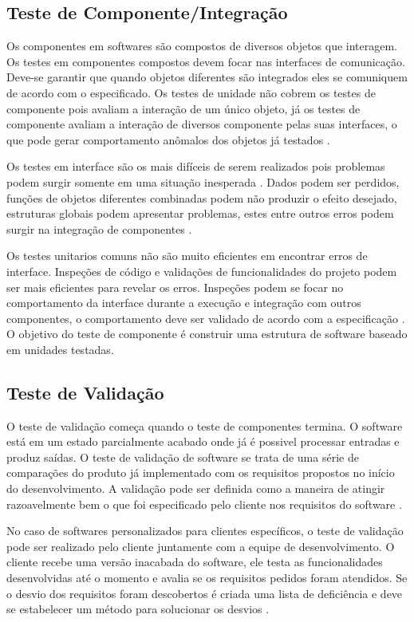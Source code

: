 \subsection{Teste de Componente/Integração}

Os componentes em softwares são compostos de diversos objetos que interagem. Os testes em componentes compostos devem focar nas interfaces de comunicação. Deve-se garantir que quando objetos diferentes são integrados eles se comuniquem de acordo com o especificado. Os testes de unidade não cobrem os testes de componente pois avaliam a interação de um único objeto, já os testes de componente avaliam a interação de diversos componente pelas suas interfaces, o que pode gerar comportamento anômalos dos objetos já testados \cite{SOMMER2011}.


Os testes em interface são os mais difíceis de serem realizados pois problemas podem surgir somente em uma situação inesperada \cite{SOMMER2011}. Dados podem ser perdidos, funções de objetos diferentes combinadas podem não produzir o efeito desejado, estruturas globais podem apresentar problemas, estes entre outros erros podem surgir na integração de componentes \cite{PRESMA2016}.


Os testes unitarios comuns não são muito eficientes em encontrar erros de interface. Inspeções de código e validações de funcionalidades do projeto podem ser mais eficientes para revelar os erros. Inspeções podem se focar no comportamento da interface durante a execução e integração com outros componentes, o comportamento deve ser validado de acordo com a especificação \cite{SOMMER2011}. O objetivo do teste de componente é construir uma estrutura de software baseado em unidades testadas.


 
\subsection{Teste de Validação}

O teste de validação começa quando o teste de componentes termina. O software está em um estado parcialmente acabado onde já é possivel processar entradas e produz saídas. O teste de validação de software se trata de uma série de comparações do produto já implementado com os requisitos propostos no início do desenvolvimento. A validação pode ser definida como a maneira de atingir razoavelmente bem o que foi especificado pelo cliente nos requisitos do software \cite{PRESMA2016}.  


No caso de softwares personalizados para clientes específicos, o teste de validação pode ser realizado pelo cliente juntamente com a equipe de desenvolvimento. O cliente recebe uma versão inacabada do software, ele testa as funcionalidades desenvolvidas até o momento e avalia se os requisitos pedidos foram atendidos. Se o  desvio dos requisitos foram descobertos é criada uma lista de deficiência e deve se estabelecer um método para solucionar os desvios \cite{PRESMA2016}.


